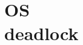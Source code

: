 \documentclass{wileySix}
\begin{document}
\chapter[DeadLock]
{OS\\ deadlock}



%

%

%

%

%







\printindex
\end{document}
